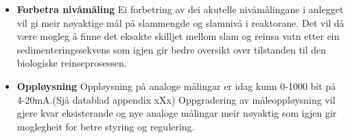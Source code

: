 \begin{itemize}
    \item \textbf{Forbetra nivåmåling} \newline
        Ei forbetring av dei akutelle nivåmålingane i anlegget vil gi meir nøyaktige mål på slammengde og slamnivå i reaktorane.
        Det vil då være mogleg å finne det eksakte skilljet mellom slam og reinsa vatn etter ein sedimenteringssekvens som igjen
        gir bedre oversikt over tilstanden til den biologiske reinseprosessen.
    \item \textbf{Oppløysning} \newline
        Oppløysning på analoge målingar er idag kunn 0-1000 bit på 4-20mA.(Sjå datablad appendix xXx) \newline
        Oppgradering av måleoppløysning vil gjere kvar eksisterande og nye analoge målingar
        meir nøyaktig som igjen gir moglegheit for betre styring og regulering.
\end{itemize}
\newpage

